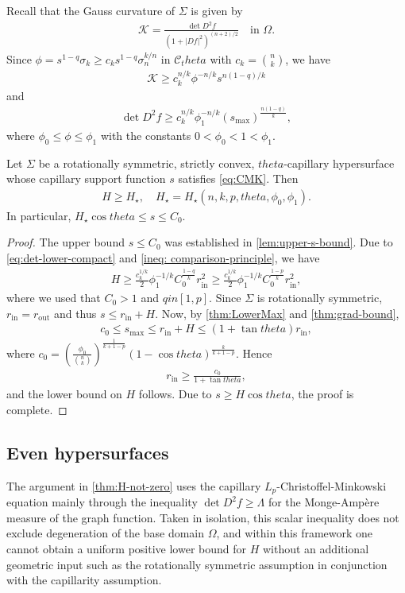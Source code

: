 \documentclass[12pt]{amsart}
\def\theta{theta}%
\def\in{in }%
\numberwithin{equation}{section}
\newcommand{\8}{\infty}
\newcommand{\Si}{\Sigma}
\newcommand{\cC}{\mathcal{C}}
\newcommand{\cK}{\mathcal{K}}
\newcommand{\eq}[1]{\begin{equation}\begin{alignedat}{2}#1\end{alignedat}\end{equation}}
\newcommand{\Cth}{\cC_\theta}
\begin{document}
Recall that the Gauss curvature of $\Sigma$ is given by
\eq{\label{eq:K-graph}
\cK = \frac{\det D^2 f}{(1+|Df|^2)^{(n+2)/2}}\quad \text{in }\Omega.
}
Since $\phi=s^{1-q}\sigma_k \ge c_k s^{1-q}\sigma_n^{k/n}$ in $\Cth$ with $c_k=\binom{n}{k}$, we have
\eq{\label{eq:K-lower-pointwise}
\cK\ge c_k^{n/k}\phi^{-n/k}s^{n(1-q)/k}
}
and
\eq{\label{eq:det-lower-compact}
\det D^2 f \ge c_k^{n/k}\phi_1^{-n/k}(s_{\max})^{\frac{n(1-q)}{k}},
}
where $\phi_0\leq \phi \leq \phi_1$ with the constants $0<\phi_0<1<\phi_1$.

\begin{thm}\label{thm:H-not-zero}
Let $\Sigma$ be a rotationally symmetric, strictly convex, $\theta$-capillary hypersurface whose capillary support function $s$ satisfies \eqref{eq:CMK}.
Then
\eq{\label{eq:H-lb-quant}
H\ge H_{\star},\quad H_{\star}=H_{\star}(n,k,p,\theta,\phi_0,\phi_1).
}
In particular, $H_{\star}\cos\theta\le s\le C_0$.
\end{thm}

\begin{proof}
The upper bound $s\leq C_0$ was established in \autoref{lem:upper-s-bound}.
Due to \eqref{eq:det-lower-compact} and \eqref{ineq: comparison-principle}, we have
\eq{
H\ge \frac{c_k^{1/k}}{2}\phi_1^{-1/k}C_0^{\frac{1-q}{k}}r_{\mathrm{in}}^2\ge \frac{c_k^{1/k}}{2}\phi_1^{-1/k}C_0^{\frac{1-p}{k}}r_{\mathrm{in}}^2,
}
where we used that $C_0>1$ and $q\in [1,p]$. Since $\Si$ is rotationally symmetric, $r_{\mathrm{in}}=r_{\mathrm{out}}$ and thus $s\leq r_{\mathrm{in}}+H$. Now, by \autoref{thm:LowerMax} and \autoref{thm:grad-bound},
\eq{
c_0\leq s_{\max}\le r_{\mathrm{in}}+H\le (1+\tan\theta)r_{\mathrm{in}},
}
where $c_0=\left(\frac{\phi_0}{\binom{n}{k}}\right)^{\frac{1}{k+1-p}}(1-\cos\theta)^{\frac{k}{k+1-p}}$. Hence
\eq{
 r_{\mathrm{in}}\ge \frac{c_0}{1+\tan\theta},
}
and the lower bound on $H$ follows. Due to $s\geq H\cos\theta$, the proof is complete.
\end{proof}

\subsection{Even hypersurfaces}

The argument in \autoref{thm:H-not-zero} uses the capillary $L_p$-Christoffel-Minkowski equation mainly through the inequality $\det D^2 f \ge \Lambda$ for the Monge-Amp\`ere measure of the graph function. Taken in isolation, this scalar inequality does not exclude degeneration of the base domain $\Omega$, and within this framework one cannot obtain a uniform positive lower bound for $H$ without an additional geometric input such as the rotationally symmetric assumption in conjunction with the capillarity assumption.
\end{document}
